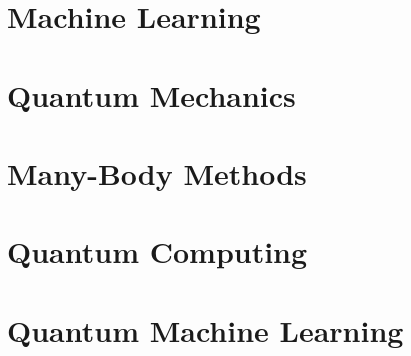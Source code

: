 \chapter{Machine Learning}

\chapter{Quantum Mechanics}

\chapter{Many-Body Methods}

\chapter{Quantum Computing}

\chapter{Quantum Machine Learning}
